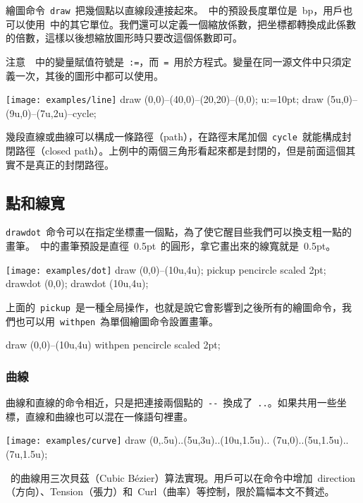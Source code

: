 繪圖命令~\verb|draw|~把幾個點以直線段連接起來。\MP~中的預設長度單位是~bp，用戶也可以使用~中的其它單位。我們還可以定義一個縮放係數，把坐標都轉換成此係數的倍數，這樣以後想縮放圖形時只要改這個係數即可。

注意~\MP~中的變量賦值符號是~\verb|:=|，而~\verb|=|~用於方程式。變量在同一源文件中只須定義一次，其後的圖形中都可以使用。

\begin{fdemo}{\texttt{[image: examples/line]}}
draw (0,0)--(40,0)--(20,20)--(0,0);
u:=10pt; %
draw (5u,0)--(9u,0)--(7u,2u)--cycle;
\end{fdemo}

幾段直線或曲線可以構成一條路徑（path），在路徑末尾加個~\verb|cycle|~就能構成封閉路徑（closed path）。上例中的兩個三角形看起來都是封閉的，但是前面這個其實不是真正的封閉路徑。

\subsection{點和線寬}
\verb|drawdot|~命令可以在指定坐標畫一個點，為了使它醒目些我們可以換支粗一點的畫筆。\MP~中的畫筆預設是直徑~0.5pt~的圓形，拿它畫出來的線寬就是~0.5pt。

\begin{fdemo}{\texttt{[image: examples/dot]}}
draw (0,0)--(10u,4u);
pickup pencircle scaled 2pt;
drawdot (0,0);
drawdot (10u,4u);
\end{fdemo}

上面的~\verb|pickup|~是一種全局操作，也就是說它會影響到之後所有的繪圖命令，我們也可以用~\verb|withpen|~為單個繪圖命令設置畫筆。

\begin{code}
draw (0,0)--(10u,4u) withpen pencircle scaled 2pt;
\end{code}

\subsubsection{曲線}
曲線和直線的命令相近，只是把連接兩個點的~\verb|--|~換成了~\verb|..|。如果共用一些坐標，直線和曲線也可以混在一條語句裡畫。

\begin{fdemo}{\texttt{[image: examples/curve]}}
draw (0,.5u)..(5u,3u)..(10u,1.5u)..
    (7u,0)..(5u,1.5u)..(7u,1.5u);
\end{fdemo}

\MP~的曲線用三次貝茲（Cubic B\'ezier）算法實現。用戶可以在命令中增加~direction（方向）、Tension（張力）和~Curl（曲率）等控制，限於篇幅本文不贅述。

